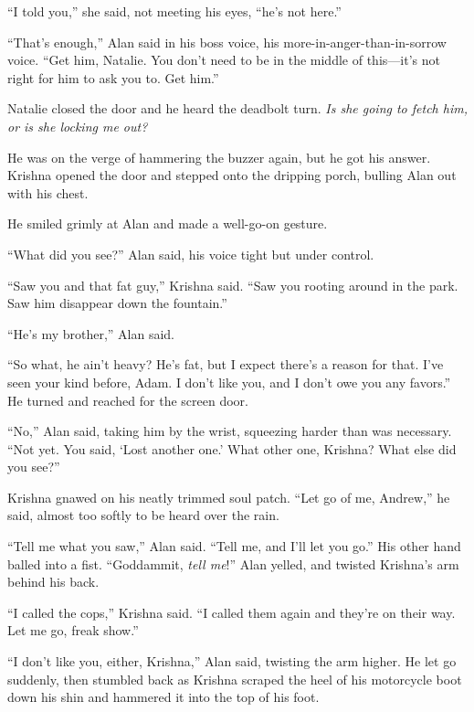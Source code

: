 ``I told you,'' she said, not meeting his eyes, ``he's not here.''

``That's enough,'' Alan said in his boss voice, his
more-in-anger-than-in-sorrow voice.  ``Get him, Natalie.  You don't
need to be in the middle of this---it's not right for him to ask you
to.  Get him.''

Natalie closed the door and he heard the deadbolt turn.  \textit{Is
she going to fetch him, or is she locking me out?}

He was on the verge of hammering the buzzer again, but he got his
answer.  Krishna opened the door and stepped onto the dripping porch,
bulling Alan out with his chest.

He smiled grimly at Alan and made a well-go-on gesture.

``What did you see?'' Alan said, his voice tight but under control.

``Saw you and that fat guy,'' Krishna said.  ``Saw you rooting around
in the park.  Saw him disappear down the fountain.''

``He's my brother,'' Alan said.

``So what, he ain't heavy?  He's fat, but I expect there's a reason
for that.  I've seen your kind before, Adam.  I don't like you, and I
don't owe you any favors.'' He turned and reached for the screen door.

``No,'' Alan said, taking him by the wrist, squeezing harder than was
necessary.  ``Not yet.  You said, `Lost another one.' What other one,
Krishna?  What else did you see?''

Krishna gnawed on his neatly trimmed soul patch.  ``Let go of me,
Andrew,'' he said, almost too softly to be heard over the rain.

``Tell me what you saw,'' Alan said.  ``Tell me, and I'll let you
go.'' His other hand balled into a fist.  ``Goddammit, \textit{tell
me}!'' Alan yelled, and twisted Krishna's arm behind his back.

``I called the cops,'' Krishna said.  ``I called them again and
they're on their way.  Let me go, freak show.''

``I don't like you, either, Krishna,'' Alan said, twisting the arm
higher.  He let go suddenly, then stumbled back as Krishna scraped the
heel of his motorcycle boot down his shin and hammered it into the top
of his foot.

